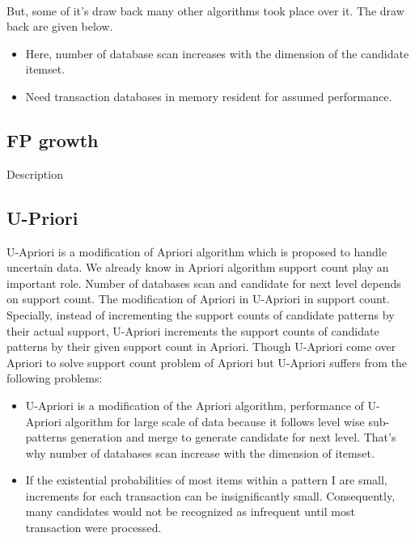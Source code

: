 \documentclass[a4paper,12pt]{book}
\begin{document}
\paragraph{}
But, some of it's draw back many other algorithms took place over it. The draw back are given below.
\begin{itemize}
 \item Here, number of database scan increases with the dimension of the candidate itemset.
  \item Need transaction databases in memory resident for assumed performance.
\end{itemize}


\subsection{FP growth}
Description
\subsection{U-Priori}
U-Apriori is a  modification of Apriori algorithm which is proposed to handle uncertain data. We already know in Apriori algorithm support count play an important role. Number of databases scan and candidate for next level depends on support count. The modification of Apriori in U-Apriori in support count. Specially, instead of incrementing the support counts of candidate patterns by their actual support, U-Apriori increments the support counts of candidate patterns by their given support count in Apriori. Though U-Apriori come over Apriori to solve support count problem of Apriori but U-Apriori suffers from the following problems:
\begin{itemize}
 \item U-Apriori is a modification of the Apriori algorithm, performance of U-Apriori algorithm for large scale of data because it follows level wise sub-patterns generation and merge to generate candidate for next level. That's why number of databases scan increase with the dimension of itemset.
  \item If the existential probabilities of most items within a pattern I are small, increments for each transaction can be insignificantly small. Consequently, many candidates would not be recognized as infrequent until most transaction were processed.
\end{itemize}
  
\end{document}
